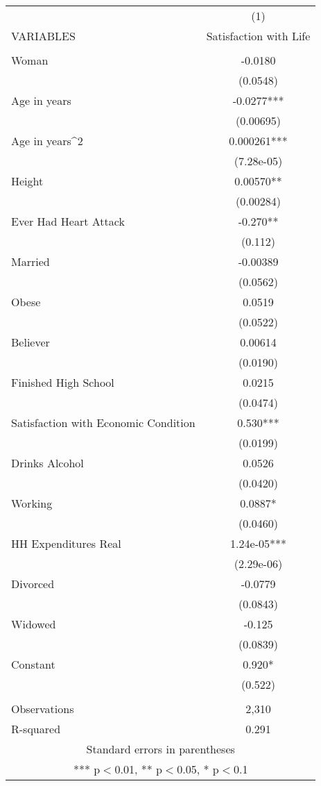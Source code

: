 \documentclass[]{article}
\begin{document}
\begin{tabular}{lc} \hline
 & (1) \\
VARIABLES & Satisfaction with Life \\ \hline
 &  \\
Woman & -0.0180 \\
 & (0.0548) \\
Age in years & -0.0277*** \\
 & (0.00695) \\
Age in years^2 & 0.000261*** \\
 & (7.28e-05) \\
Height & 0.00570** \\
 & (0.00284) \\
Ever Had Heart Attack & -0.270** \\
 & (0.112) \\
Married & -0.00389 \\
 & (0.0562) \\
Obese & 0.0519 \\
 & (0.0522) \\
Believer & 0.00614 \\
 & (0.0190) \\
Finished High School & 0.0215 \\
 & (0.0474) \\
Satisfaction with Economic Condition & 0.530*** \\
 & (0.0199) \\
Drinks Alcohol & 0.0526 \\
 & (0.0420) \\
Working & 0.0887* \\
 & (0.0460) \\
HH Expenditures Real & 1.24e-05*** \\
 & (2.29e-06) \\
Divorced & -0.0779 \\
 & (0.0843) \\
Widowed & -0.125 \\
 & (0.0839) \\
Constant & 0.920* \\
 & (0.522) \\
 &  \\
Observations & 2,310 \\
 R-squared & 0.291 \\ \hline
\multicolumn{2}{c}{ Standard errors in parentheses} \\
\multicolumn{2}{c}{ *** p$<$0.01, ** p$<$0.05, * p$<$0.1} \\
\end{tabular}
\end{document}
